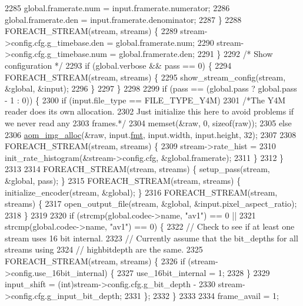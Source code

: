 \begin{DoxyCodeInclude}
{{{{{{{{{{{{{{{{{{{{{{{{{{{{{{{{{{{{{{{{{{{{{{{{{{{{{{2285       global.framerate.num = input.framerate.numerator;
2286       global.framerate.den = input.framerate.denominator;
2287     \}
2288     FOREACH\_STREAM(stream, streams) \{
2289       stream->config.cfg.g\_timebase.den = global.framerate.num;
2290       stream->config.cfg.g\_timebase.num = global.framerate.den;
2291     \}
2292     \textcolor{comment}{/* Show configuration */}
2293     \textcolor{keywordflow}{if} (global.verbose && pass == 0) \{
2294       FOREACH\_STREAM(stream, streams) \{
2295         show\_stream\_config(stream, &global, &input);
2296       \}
2297     \}
2298 
2299     \textcolor{keywordflow}{if} (pass == (global.pass ? global.pass - 1 : 0)) \{
2300       \textcolor{keywordflow}{if} (input.file\_type == FILE\_TYPE\_Y4M)
2301         \textcolor{comment}{/*The Y4M reader does its own allocation.}
2302 \textcolor{comment}{          Just initialize this here to avoid problems if we never read any}
2303 \textcolor{comment}{          frames.*/}
2304         memset(&raw, 0, \textcolor{keyword}{sizeof}(raw));
2305       \textcolor{keywordflow}{else}
2306         \hyperlink{aom__image_8h_a570db29fbd122951235a08fe9375f6bb}{aom\_img\_alloc}(&raw, input.\hyperlink{structaom__image_a6c64b1ab918d80d52eb8f5d6d957e825}{fmt}, input.width, input.height, 32);
2307 
2308       FOREACH\_STREAM(stream, streams) \{
2309         stream->rate\_hist =
2310             init\_rate\_histogram(&stream->config.cfg, &global.framerate);
2311       \}
2312     \}
2313 
2314     FOREACH\_STREAM(stream, streams) \{ setup\_pass(stream, &global, pass); \}
2315     FOREACH\_STREAM(stream, streams) \{ initialize\_encoder(stream, &global); \}
2316     FOREACH\_STREAM(stream, streams) \{
2317       open\_output\_file(stream, &global, &input.pixel\_aspect\_ratio);
2318     \}
2319 
2320     \textcolor{keywordflow}{if} (strcmp(global.codec->name, \textcolor{stringliteral}{"av1"}) == 0 ||
2321         strcmp(global.codec->name, \textcolor{stringliteral}{"av1"}) == 0) \{
2322       \textcolor{comment}{// Check to see if at least one stream uses 16 bit internal.}
2323       \textcolor{comment}{// Currently assume that the bit\_depths for all streams using}
2324       \textcolor{comment}{// highbitdepth are the same.}
2325       FOREACH\_STREAM(stream, streams) \{
2326         \textcolor{keywordflow}{if} (stream->config.use\_16bit\_internal) \{
2327           use\_16bit\_internal = 1;
2328         \}
2329         input\_shift = (int)stream->config.cfg.g\_bit\_depth -
2330                       stream->config.cfg.g\_input\_bit\_depth;
2331       \};
2332     \}
2333 
2334     frame\_avail = 1;
}}}}}}}}}}}}}}}}}}}}}}}}}}}}}}}}}}}}}}}}}}}}}}}}}}}}}}
\end{DoxyCodeInclude}
